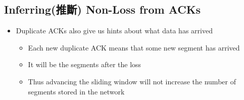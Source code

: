 \documentclass[12pt]{ctexart}   %
\begin{document}
	\subsection{Inferring(推斷) Non-Loss from ACKs}
	\begin{itemize}
		\item Duplicate ACKs also give us hints about what data has arrived
		\begin{itemize}
			\item Each new duplicate ACK means that some new segment has arrived
			\item It will be the segments after the loss
			\item Thus advancing the sliding window will not increase the number of segments stored in the network
		\end{itemize}
	\end{itemize}
	
\end{document}
